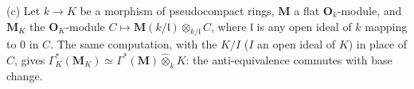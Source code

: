 (c) Let \(k\to K\) be a morphism of pseudocompact rings, \(\mathbf M\) a flat \(\mathbf O_k\)-module, and
\(\mathbf M_K\) the \(\mathbf O_K\)-module \(C\mapsto\mathbf M(k/\mathfrak l)\otimes_{k/\mathfrak l}C\),
where \(\mathfrak l\) is any open ideal of \(k\) mapping to \(0\) in \(C\). The same computation, with the
\(K/I\) (\(I\) an open ideal of \(K\)) in place of \(C\), gives
\(\Gamma^*_K(\mathbf M_K)\simeq\Gamma^*(\mathbf M)\widehat\otimes_kK\): the anti-equivalence commutes with
base change.
